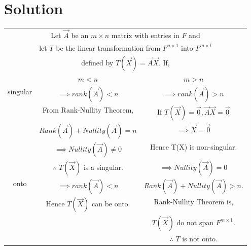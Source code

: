 \documentclass[journal,12pt,twocolumn]{IEEEtran}
\begin{document}
\section{Solution}
\begin{table}[hp]
	\begin{center}
	\begin{adjustbox}{width=1\textwidth}
		\begin{tabular}{|c|c|c|}			
			\hline
			\multicolumn{3}{|c|}{Let $\vec{A}$ be an $m \times n$ matrix with entries in $F$ and}\\
			\multicolumn{3}{|c|}{let $T$ be the linear transformation from $F^{n \times1 }$ into $F^{m \times l}$}\\
			\multicolumn{3}{|c|}{defined by $T(\vec{X}) = \vec{A}\vec{X}$. If,}\\			
			\hline
			& \multicolumn{1}{|c|}{$m < n$} & \multicolumn{1}{c|}{$m > n$}\\
			\hline
			\multirow{4}{*}{singular} & \vbox{\begin{equation}\nonumber \implies rank(\vec{A}) < n \end{equation}} & \vbox{\begin{equation}\nonumber\implies rank(\vec{A}) > n\end{equation}}\\
			& From Rank-Nullity Theorem, & $\text{If }T(\vec{X}) = \vec{0}, \vec{A}\vec{X} = \vec{0}$\\
			& \vbox{\begin{equation}\nonumber Rank(\vec{A}) + Nullity(\vec{A}) = n\end{equation}} & $\implies \vec{X} = \vec{0}$\\
			& $\implies Nullity(\vec{A}) \neq 0$ & Hence T(X) is non-singular.\\
			& $\therefore$ $T(\vec{X})$ is a singular. & \vbox{\begin{equation}\nonumber \implies Nullity(\vec{A}) = 0\end{equation}}\\
			\hline
			\multirow{4}{*}{onto} & \vbox{\begin{equation}\nonumber \implies rank(\vec{A}) < n \end{equation}} & \vbox{\begin{equation}\nonumber Rank(\vec{A}) + Nullity(\vec{A}) > n.\end{equation}}\\
			& Hence $T(\vec{X})$ can be onto. & Rank-Nullity Theorem is,\\
			& & $T(\vec{X})$ do not span $F^{m \times 1}.$\\
			&  & $\therefore$ $T$ is not onto.\\
			\hline
			\end{tabular}
			\end{adjustbox}
	\end{center}
\end{table}
\end{document}
